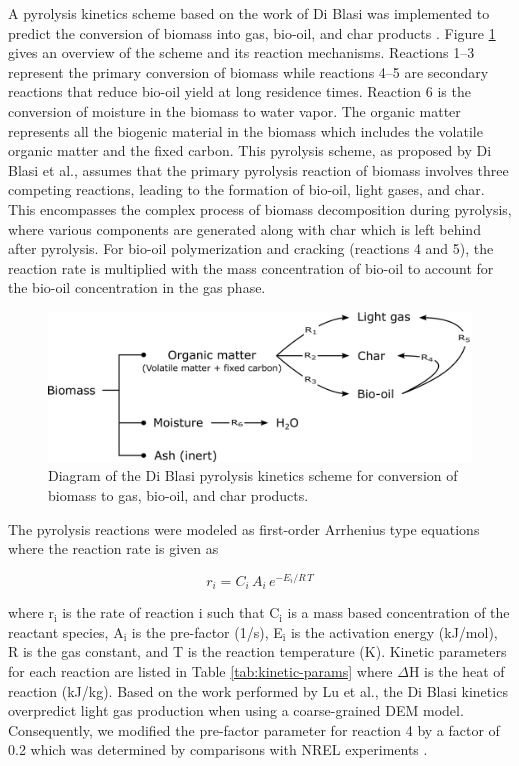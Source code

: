 \documentclass{article}
\begin{document}
A pyrolysis kinetics scheme based on the work of Di Blasi was implemented to predict the conversion of biomass into gas, bio-oil, and char products \cite{Blasi-1993,Blasi-2001}. Figure \ref{fig:blasi} gives an overview of the scheme and its reaction mechanisms. Reactions 1--3 represent the primary conversion of biomass while reactions 4--5 are secondary reactions that reduce bio-oil yield at long residence times. Reaction 6 is the conversion of moisture in the biomass to water vapor. The organic matter represents all the biogenic material in the biomass which includes the volatile organic matter and the fixed carbon. This pyrolysis scheme, as proposed by Di Blasi et al., assumes that the primary pyrolysis reaction of biomass involves three competing reactions, leading to the formation of bio-oil, light gases, and char. This encompasses the complex process of biomass decomposition during pyrolysis, where various components are generated along with char which is left behind after pyrolysis. For bio-oil polymerization and cracking (reactions 4 and 5), the reaction rate is multiplied with the mass concentration of bio-oil to account for the bio-oil concentration in the gas phase.

\begin{figure}[H]
    \centering
    \includegraphics[width=1.0\textwidth]{kinetics.pdf}
    \caption{Diagram of the Di Blasi pyrolysis kinetics scheme for conversion of biomass to gas, bio-oil, and char products.}
    \label{fig:blasi}
\end{figure}

\noindent The pyrolysis reactions were modeled as first-order Arrhenius type equations where the reaction rate is given as

\begin{equation}
    r_i = C_i\,A_i\,e^{-E_i / R\,T}
\end{equation}

\noindent where r$_\text{i}$ is the rate of reaction i such that C$_\text{i}$ is a mass based concentration of the reactant species, A$_\text{i}$ is the pre-factor (1/s), E$_\text{i}$ is the activation energy (kJ/mol), R is the gas constant, and T is the reaction temperature (K). Kinetic parameters for each reaction are listed in Table \ref{tab:kinetic-params} where $\Delta$H is the heat of reaction (kJ/kg). Based on the work performed by Lu et al.\cite{lu2020bridging}, the Di Blasi kinetics overpredict light gas production when using a coarse-grained DEM model. Consequently, we modified the pre-factor parameter for reaction 4 by a factor of 0.2 which was determined by comparisons with NREL experiments \cite{French-2021}.
\end{document}
